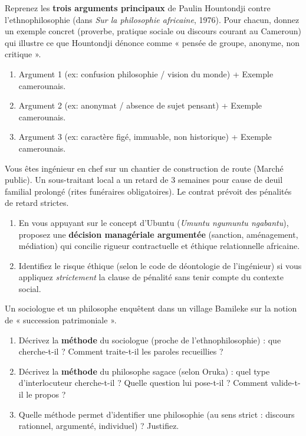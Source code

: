 \documentclass[11pt]{article}
\newcommand{\cle}[1]{{\popxbold\color{popdark}#1}}
\begin{document}
\begin{exercice}
Reprenez les \textbf{trois arguments principaux} de Paulin Hountondji contre l'ethnophilosophie (dans \emph{Sur la philosophie africaine}, 1976). Pour chacun, donnez un exemple concret (proverbe, pratique sociale ou discours courant au Cameroun) qui illustre ce que Hountondji dénonce comme « pensée de groupe, anonyme, non critique ».
\begin{methode}
\begin{enumerate}
\item Argument 1 (ex: confusion philosophie / vision du monde) + Exemple camerounais.
\item Argument 2 (ex: anonymat / absence de sujet pensant) + Exemple camerounais.
\item Argument 3 (ex: caractère figé, immuable, non historique) + Exemple camerounais.
\end{enumerate}
\end{methode}
\end{exercice}

\begin{exercice}
Vous êtes ingénieur en chef sur un chantier de construction de route (Marché public). Un sous-traitant local a un retard de 3 semaines pour cause de deuil familial prolongé (rites funéraires obligatoires). Le contrat prévoit des pénalités de retard strictes.
\begin{enumerate}
    \item En vous appuyant sur le concept d'\cle{Ubuntu} (\emph{Umuntu ngumuntu ngabantu}), proposez une \textbf{décision managériale argumentée} (sanction, aménagement, médiation) qui concilie rigueur contractuelle et éthique relationnelle africaine.
    \item Identifiez le risque éthique (selon le code de déontologie de l'ingénieur) si vous appliquez \emph{strictement} la clause de pénalité sans tenir compte du contexte social.
\end{enumerate}
\end{exercice}

\begin{exercice}
Un sociologue et un philosophe enquêtent dans un village Bamileke sur la notion de « succession patrimoniale ».
\begin{enumerate}
    \item Décrivez la \textbf{méthode} du sociologue (proche de l'ethnophilosophie) : que cherche-t-il ? Comment traite-t-il les paroles recueillies ?
    \item Décrivez la \textbf{méthode} du philosophe sagace (selon Oruka) : quel type d'interlocuteur cherche-t-il ? Quelle question lui pose-t-il ? Comment valide-t-il le propos ?
    \item Quelle méthode permet d'identifier une \cle{philosophie} (au sens strict : discours rationnel, argumenté, individuel) ? Justifiez.
\end{enumerate}
\end{exercice}
\end{document}
